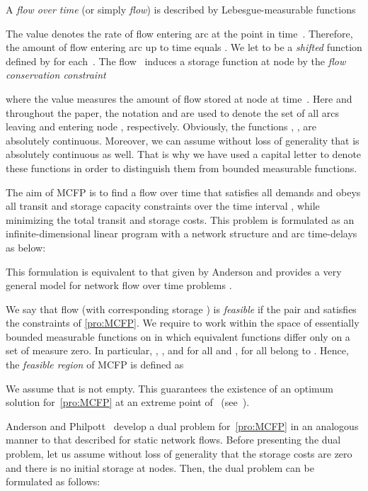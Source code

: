 \documentclass{svjour3}                     \smartqed
\begin{document}
A \emph{flow over time} (or simply \emph{flow})  is described by Lebesgue-measurable  functions

The value  denotes the rate of flow entering arc  at the point in time~. Therefore, the amount of flow entering arc  up to time  equals . We let  to be a \emph{shifted} function defined by  for each~. The flow~ induces a storage function  at node  by the {\em flow conservation constraint}

where the value  measures the amount of flow stored at node  at time~. Here and throughout the paper, the notation  and  are used to denote the set of all arcs leaving and entering node , respectively. Obviously, the functions , ,  are absolutely continuous. Moreover, we can assume without loss of generality that  is absolutely continuous as well. That is why we have used a capital letter to denote these functions in order to distinguish them from bounded measurable functions.


The aim of MCFP is to find a flow over time that satisfies all demands and obeys
all transit and storage capacity constraints over the time
interval , while minimizing the total transit and storage costs.
This problem is formulated as an infinite-dimensional
linear program with a network structure and arc time-delays as below:

This formulation is equivalent to that given by Anderson \cite{Anderson89} and provides a very general model for network flow over time problems . 

We say that flow  (with corresponding storage ) is \emph{feasible} if the pair  and  satisfies the constraints of \eqref{pro:MCFP}.
We require to work within the space  of essentially bounded measurable functions on  in which equivalent functions differ only on a set of measure zero. In particular, , , and  for all  and ,  for all  belong to . Hence, the {\em feasible region}  of MCFP is defined as

We assume that  is not empty. This guarantees the existence of an optimum solution for~\eqref{pro:MCFP} at an
extreme point of~ (see~\cite[Theorem 3.1]{Pullan97}).


Anderson and Philpott~\cite{AndersonPhilpott94} develop a dual problem for~\eqref{pro:MCFP} in an analogous manner to that described for static network flows. Before presenting the dual problem, let us assume without loss of generality that the storage costs are zero and there is no initial storage at nodes. Then, the dual problem can be formulated as follows:
\end{document}
